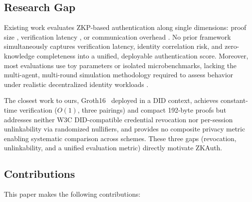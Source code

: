 \documentclass[journal,12pt,onecolumn]{IEEEtran}
\begin{document}
\subsection{Research Gap}

Existing work evaluates ZKP-based authentication along single
dimensions: proof size \cite{maller2019sonic}, verification
latency \cite{setty2020spartan}, or communication overhead
\cite{wahby2019full}. No prior framework simultaneously captures
verification latency, identity correlation risk, and zero-knowledge
completeness into a unified, deployable authentication score. Moreover,
most evaluations use toy parameters or isolated microbenchmarks, lacking
the multi-agent, multi-round simulation methodology required to assess
behavior under realistic decentralized identity workloads
\cite{tan2025zkauth_survey}.

The closest work to ours, Groth16~\cite{groth2016size} deployed in a
DID context, achieves constant-time verification ($O(1)$, three pairings)
and compact 192-byte proofs but addresses neither W3C DID-compatible
credential revocation nor per-session unlinkability via randomized
nullifiers, and provides no composite privacy metric enabling systematic
comparison across schemes. These three gaps (revocation, unlinkability,
and a unified evaluation metric) directly motivate ZKAuth.

\subsection{Contributions}

This paper makes the following contributions:
\end{document}
